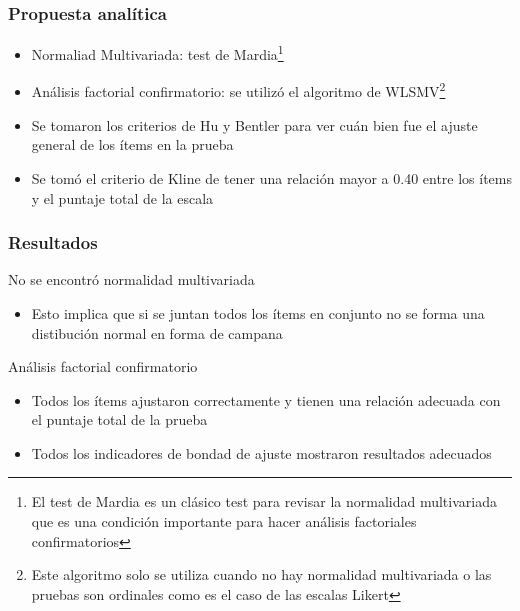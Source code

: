 \documentclass{beamer}
\begin{document}
\begin{frame}
\frametitle{Propuesta analítica}

\begin{itemize}
\item Normaliad Multivariada: test de Mardia\footnote{El test de Mardia es un clásico test para revisar la normalidad multivariada que es una condición importante para hacer análisis factoriales confirmatorios}	
\item Análisis factorial confirmatorio: se utilizó el algoritmo de WLSMV\footnote{Este algoritmo solo se utiliza cuando no hay normalidad multivariada o las pruebas son ordinales como es el caso de las escalas Likert}	
\item Se tomaron los criterios de Hu y Bentler para ver cuán bien fue el ajuste general de los ítems en la prueba
\item Se tomó el criterio de Kline de tener una relación mayor a 0.40 entre los ítems y el puntaje total de la escala


\end{itemize}	

\end{frame}

\begin{frame}
\frametitle{Resultados}


\begin{block}{No se encontró normalidad multivariada}
\begin{itemize}
\item Esto implica que si se juntan todos los ítems en conjunto no se forma una distibución normal en forma de campana
\end{itemize}
\end{block}

\begin{examples}{Análisis factorial confirmatorio}
\begin{itemize}
\item Todos los ítems ajustaron correctamente y tienen una relación adecuada con el puntaje total de la prueba
\item Todos los indicadores de bondad de ajuste mostraron resultados adecuados 
\end{itemize}
\end{examples}

\end{frame}
\end{document}

